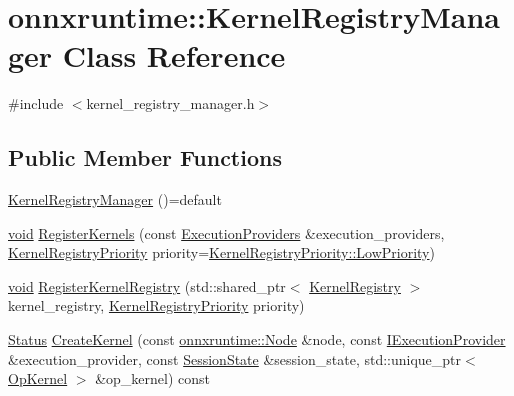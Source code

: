 \hypertarget{classonnxruntime_1_1KernelRegistryManager}{}\section{onnxruntime\+:\+:Kernel\+Registry\+Manager Class Reference}
\label{classonnxruntime_1_1KernelRegistryManager}


{\ttfamily \#include $<$kernel\+\_\+registry\+\_\+manager.\+h$>$}

\subsection*{Public Member Functions}
\begin{DoxyCompactItemize}
\item 
\mbox{\hyperlink{classonnxruntime_1_1KernelRegistryManager_a94f8cccaf59a0a6a791531fcd8fadd61}{Kernel\+Registry\+Manager}} ()=default
\item 
\mbox{\hyperlink{mlasi_8h_a88f941d423cb2a819b70a1358982b1a6}{void}} \mbox{\hyperlink{classonnxruntime_1_1KernelRegistryManager_abecffc9d198c1af9660a9f2582ed6e2f}{Register\+Kernels}} (const \mbox{\hyperlink{classonnxruntime_1_1ExecutionProviders}{Execution\+Providers}} \&execution\+\_\+providers, \mbox{\hyperlink{namespaceonnxruntime_afa2fd0cbc7f0bae88fb9bfe75319a5a4}{Kernel\+Registry\+Priority}} priority=\mbox{\hyperlink{namespaceonnxruntime_afa2fd0cbc7f0bae88fb9bfe75319a5a4a0fc33710ab0ebbd6d1fcff0bc6cc7f3d}{Kernel\+Registry\+Priority\+::\+Low\+Priority}})
\item 
\mbox{\hyperlink{mlasi_8h_a88f941d423cb2a819b70a1358982b1a6}{void}} \mbox{\hyperlink{classonnxruntime_1_1KernelRegistryManager_ad031e9f6951422bce513d7bab16dae7e}{Register\+Kernel\+Registry}} (std\+::shared\+\_\+ptr$<$ \mbox{\hyperlink{classonnxruntime_1_1KernelRegistry}{Kernel\+Registry}} $>$ kernel\+\_\+registry, \mbox{\hyperlink{namespaceonnxruntime_afa2fd0cbc7f0bae88fb9bfe75319a5a4}{Kernel\+Registry\+Priority}} priority)
\item 
\mbox{\hyperlink{classonnxruntime_1_1common_1_1Status}{Status}} \mbox{\hyperlink{classonnxruntime_1_1KernelRegistryManager_af32cb698da68c2c1fdb1da2256e5156c}{Create\+Kernel}} (const \mbox{\hyperlink{classonnxruntime_1_1Node}{onnxruntime\+::\+Node}} \&node, const \mbox{\hyperlink{classonnxruntime_1_1IExecutionProvider}{I\+Execution\+Provider}} \&execution\+\_\+provider, const \mbox{\hyperlink{classonnxruntime_1_1SessionState}{Session\+State}} \&session\+\_\+state, std\+::unique\+\_\+ptr$<$ \mbox{\hyperlink{classonnxruntime_1_1OpKernel}{Op\+Kernel}} $>$ \&op\+\_\+kernel) const

\end{DoxyCompactItemize}
